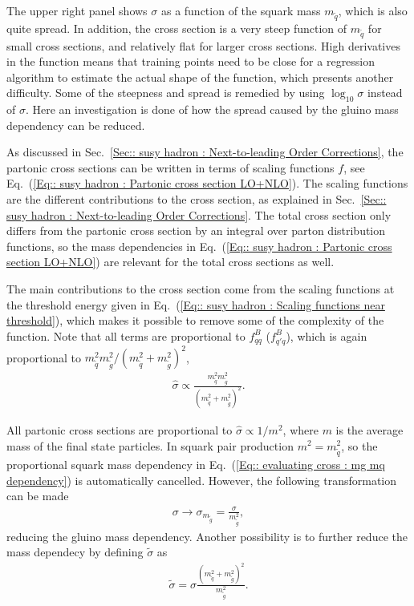 \documentclass[twoside,english]{uiofysmaster}
\begin{document}
{{The upper right panel shows $\sigma$ as a function of the squark mass $m_{\widetilde{q}}$, which is also quite spread. In addition, the cross section is a very steep function of $m_{\widetilde{q}}$ for small cross sections, and relatively flat for larger cross sections. High derivatives in the function means that training points need to be close for a regression algorithm to estimate the actual shape of the function, which presents another difficulty. Some of the steepness and spread is remedied by using $\log_{10} \sigma$ instead of $\sigma$. Here an investigation is done of how the spread caused by the gluino mass dependency can be reduced.


As discussed in Sec.~\ref{Sec:: susy hadron : Next-to-leading Order Corrections}, the partonic cross sections can be written in terms of scaling functions $f$, see Eq.~(\ref{Eq:: susy hadron : Partonic cross section LO+NLO}). The scaling functions are the different contributions to the cross section, as explained in Sec.~\ref{Sec:: susy hadron : Next-to-leading Order Corrections}. The total cross section only differs from the partonic cross section by an integral over parton distribution functions, so the mass dependencies in Eq.~(\ref{Eq:: susy hadron : Partonic cross section LO+NLO}) are relevant for the total cross sections as well.

The main contributions to the cross section come from the scaling functions at the threshold energy given in Eq.~(\ref{Eq:: susy hadron : Scaling functions near threshold}), which makes it possible to remove some of the complexity of the function. Note that all terms are proportional to $f_{qq}^B$ ($f_{q'q}^B$), which is again proportional to $m_{\widetilde{q}}^2 m_{\widetilde{g}}^2/(m_{\widetilde{q}}^2 +m_{\widetilde{g}}^2)^2$,
\begin{align}\label{Eq:: evaluating cross : mg mq dependency}
\hat{\sigma} \propto \frac{m_{\widetilde{q}}^2 m_{\widetilde{g}}^2}{(m_{\widetilde{q}}^2 +m_{\widetilde{g}}^2)^2}.
\end{align}

All partonic cross sections are proportional to $\hat{\sigma} \propto 1/m^2$, where $m$ is the average mass of the final state particles. In squark pair production $m^2 = m_{\widetilde{q}}^2$, so the proportional squark mass dependency in Eq.~(\ref{Eq:: evaluating cross : mg mq dependency}) is automatically cancelled. However, the following transformation can be made
\begin{align}
\sigma \rightarrow \sigma_{m_{\widetilde{g}}} = \frac{\sigma}{m_{\widetilde{g}}^2},
\end{align}
reducing the gluino mass dependency. Another possibility is to further reduce the mass dependecy by defining $\tilde{\sigma}$ as 
\begin{align}
\tilde{\sigma} = \sigma \frac{(m_{\widetilde{q}}^2 + m_{\widetilde{g}}^2)^2}{m_{\widetilde{g}}^2}.
\end{align}


}}
\end{document}
